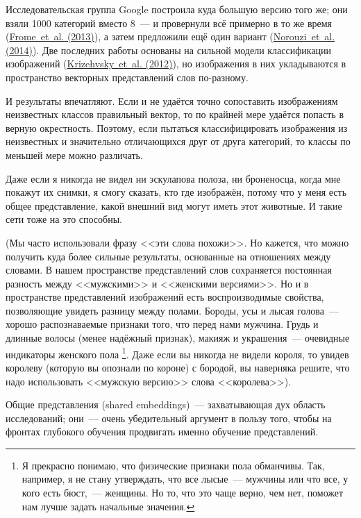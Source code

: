 \documentclass[a4paper,12pt]{article}
\begin{document}
Исследовательская группа Google построила куда большую версию того же; они взяли 1000 категорий вместо 8~--- и провернули всё примерно в то же время  (\href{http://static.googleusercontent.com/media/research.google.com/en//pubs/archive/41473.pdf}{Frome~et~al. (2013)}), а затем предложили ещё один вариант (\href{http://arxiv.org/pdf/1312.5650.pdf}{Norouzi~et~al. (2014)}). Две последних работы основаны на сильной модели классификации изображений (\href{http://www.cs.toronto.edu/~fritz/absps/imagenet.pdf}{Krizehvsky~et~al. (2012)}), но изображения в них укладываются в пространство векторных представлений слов по-разному.

И результаты впечатляют. Если и не удаётся точно сопоставить изображениям неизвестных классов правильный вектор, то по крайней мере удаётся попасть в верную окрестность. Поэтому, если пытаться классифицировать изображения из неизвестных и значительно отличающихся друг от друга категорий, то классы по меньшей мере можно различать.

Даже если я никогда не видел ни эскулапова полоза, ни броненосца, когда мне покажут их снимки, я смогу сказать, кто где изображён, потому что у меня есть общее представление, какой внешний вид могут иметь этот животные. И такие сети тоже на это способны.

(Мы часто использовали фразу <<эти слова похожи>>. Но кажется, что можно получить куда более сильные результаты, основанные на отношениях между словами. В нашем пространстве представлений слов сохраняется постоянная разность между <<мужскими>> и <<женскими версиями>>. Но и в пространстве представлений изображений есть воспроизводимые свойства, позволяющие увидеть разницу между полами. Бороды, усы и лысая голова~--- хорошо распознаваемые признаки того, что перед нами мужчина. Грудь и длинные волосы (менее надёжный признак), макияж и украшения~--- очевидные индикаторы женского пола \footnote{Я прекрасно понимаю, что физические признаки пола обманчивы. Так, например, я не стану утверждать, что все лысые~--- мужчины или что все, у кого есть бюст,~--- женщины.  Но то, что это чаще верно, чем нет, поможет нам лучше задать начальные значения.
}. Даже если вы никогда не видели короля, то увидев королеву (которую вы опознали по короне) с бородой, вы наверняка решите, что надо использовать <<мужскую версию>> слова <<королева>>).

Общие представления (shared embeddings)~--- захватывающая дух область исследований; они~--- очень убедительный аргумент в пользу того, чтобы на фронтах глубокого обучения продвигать именно обучение представлений.
\end{document}
